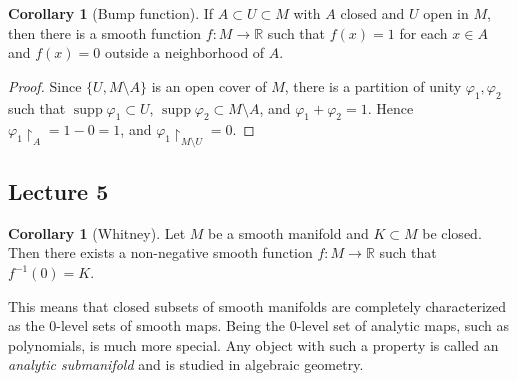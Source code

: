 \documentclass[10pt,letterpaper,cm]{nupset}
\theoremstyle{definition}
\theoremstyle{theorem}
\newtheorem{corollary}[definition]{Corollary}
\theoremstyle{remark}
\newcommand{\R}{\mathbb R}
\newcommand{\1}{\mathbf{1}}
\newcommand{\0}{\vec 0}
\DeclareMathOperator{\supp}{supp}
\begin{document}
\begin{corollary}[Bump function]
If $A \subset U \subset M$ with $A$ closed and $U$ open in $M$, then there is a  smooth function $f: M \to \R$ such that $f(x) = 1$ for each $x\in A$ and $f(x) =0$ outside a neighborhood of $A$.
\end{corollary}

\begin{proof}
Since $\{U, M \setminus A\}$ is an open cover of $M$, there is a partition of unity $\varphi_1, \varphi_2$ such that $\supp \varphi_1 \subset U$, $\supp \varphi_2 \subset M \setminus A$, and $\varphi_1 + \varphi_2 = 1$. Hence $\varphi_1 \restriction_A = 1 - 0 = 1$, and $\varphi_1 \restriction_{M\setminus U} = 0$.
\end{proof}

\subsection{Lecture 5}

\begin{corollary}[Whitney]
Let $M$ be a smooth manifold and $K \subset M$ be closed. Then there exists a non-negative smooth function $f: M \to \R$ such that $f^{-1}(0) =K$.
\end{corollary}

This means that closed subsets of smooth manifolds are completely characterized as the $0$-level sets of smooth maps. Being the $0$-level set of analytic maps, such as polynomials, is much more special. Any object with such a property is called an \textit{analytic submanifold} and is studied in algebraic geometry.
\end{document}
